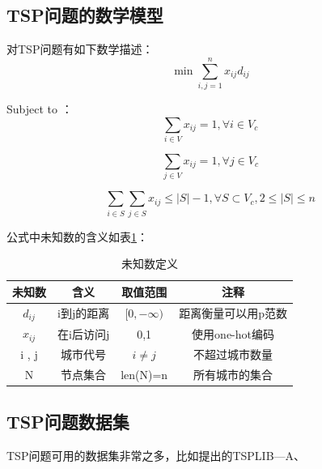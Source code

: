 \documentclass[lang=cn,11pt]{elegantpaper}
\begin{document}
\subsection{TSP问题的数学模型}
对TSP问题有如下数学描述：
\begin{equation}
    \min \sum_{i,j=1}^{n} x_{ij} d_{ij} 
    \label{eq:tsp description}
\end{equation}

Subject to ：
\begin{equation}
    \sum_{i\in V} x_{i j}=1 , \forall i \in V_{c}
    \label{eq:binom}
\end{equation}

\begin{equation}
    \sum_{j\in V} x_{i j}=1 , \forall j \in V_{c}
    \label{eq:binom}
\end{equation}

\begin{equation}
    \sum_{i\in S} \sum_{j\in S} x_{i j}\leq \lvert S \rvert - 1  , \forall S \subset V_{c} , 2 \leq \lvert S \rvert \leq n
    \label{eq:binom}
\end{equation}

公式中未知数的含义如表\ref{tab:annotation of the mathematic description}：
\begin{table}[ht]
  \small
  \centering%
  \caption{未知数定义 \label{tab:annotation of the mathematic description}}
    \begin{tabular}{c c c c}%
    \toprule
        未知数    &  含义         &        取值范围    &  注释  \\
    \midrule
    $d_{ij}$     &    i到j的距离  &   $[0,-\infty) $  &  距离衡量可以用p范数  \\
    $x_{ij}$     &   在i后访问j   &      0,1         & 使用one-hot编码 \\
    i , j       &   城市代号     &  $i \neq j $       & 不超过城市数量          \\
    N       &   节点集合     &  len(N)=n       &    所有城市的集合       \\
    \bottomrule
    \end{tabular}%
\end{table}%

\subsection{TSP问题数据集}
TSP问题可用的数据集非常之多，比如\cite{tspdataset}提出的TSPLIB—A、
\end{document}
